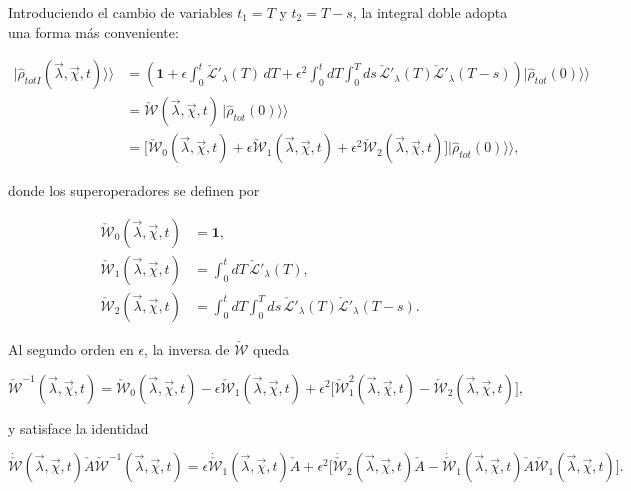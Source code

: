 \begin{appendixs}
Introduciendo el cambio de variables \(t_1=T\) y \(t_2=T-s\), la integral doble adopta una forma más conveniente:

\begin{align*}
|\hat{\rho}_{totI}(\vec{\lambda},\vec{\chi},t)\rangle \rangle  
&= \left( \mathbf{1} + \epsilon \int_{0}^{t}\check{\mathcal{L}}'_{\lambda}(T)\,dT + \epsilon^{2}\int_{0}^{t}dT\int_{0}^{T}ds\, \check{\mathcal{L}}'_{\lambda}(T)\check{\mathcal{L}}'_{\lambda}(T-s) \right)|\hat{\rho}_{tot}(0)\rangle \rangle  \\
&= \check{\mathcal{W}}(\vec{\lambda},\vec{\chi},t)\,|\hat{\rho}_{tot}(0)\rangle \rangle \\
&=  \big[\check{\mathcal{W}}_{0}(\vec{\lambda},\vec{\chi},t) + \epsilon \check{\mathcal{W}}_{1}(\vec{\lambda},\vec{\chi},t) + \epsilon^{2}\check{\mathcal{W}}_{2}(\vec{\lambda},\vec{\chi},t)\big] |\hat{\rho}_{tot}(0)\rangle \rangle ,
\end{align*}

donde los superoperadores se definen por

\begin{align*}
\check{\mathcal{W}}_{0}(\vec{\lambda},\vec{\chi},t) &= \mathbf{1},\\
\check{\mathcal{W}}_{1}(\vec{\lambda},\vec{\chi},t) &= \int_{0}^{t}dT \,\check{\mathcal{L}}'_{\lambda}(T),\\
\check{\mathcal{W}}_{2}(\vec{\lambda},\vec{\chi},t) &= \int_{0}^{t}dT \int_{0}^{T}ds \,\check{\mathcal{L}}'_{\lambda}(T)\check{\mathcal{L}}'_{\lambda}(T-s).
\end{align*}

Al segundo orden en \(\epsilon\), la inversa de \(\check{\mathcal{W}}\) queda

\begin{equation}
\check{\mathcal{W}}^{-1}(\vec{\lambda},\vec{\chi},t) =  \check{\mathcal{W}}_{0}(\vec{\lambda},\vec{\chi},t) - \epsilon  \check{\mathcal{W}}_{1}(\vec{\lambda},\vec{\chi},t) +  \epsilon^{2}\big[\check{\mathcal{W}}^{2}_{1}(\vec{\lambda},\vec{\chi},t) -  \check{\mathcal{W}}_{2}(\vec{\lambda},\vec{\chi},t) \big],
\label{apendix2inverseW}
\end{equation}

y satisface la identidad

\begin{equation}
\dot{\check{\mathcal{W}}}(\vec{\lambda},\vec{\chi},t)\check{A}\check{\mathcal{W}}^{-1}(\vec{\lambda},\vec{\chi},t) = \epsilon \dot{\check{\mathcal{W}}}_{1}(\vec{\lambda},\vec{\chi},t)\check{A} + \epsilon^{2}\big[\dot{\check{\mathcal{W}}}_{2}(\vec{\lambda},\vec{\chi},t)\check{A} - \dot{\check{\mathcal{W}}}_{1}(\vec{\lambda},\vec{\chi},t)\check{A}\check{\mathcal{W}}_{1}(\vec{\lambda},\vec{\chi},t) \big].
\label{apendix2Wproperty}
\end{equation}


\end{appendixs}
